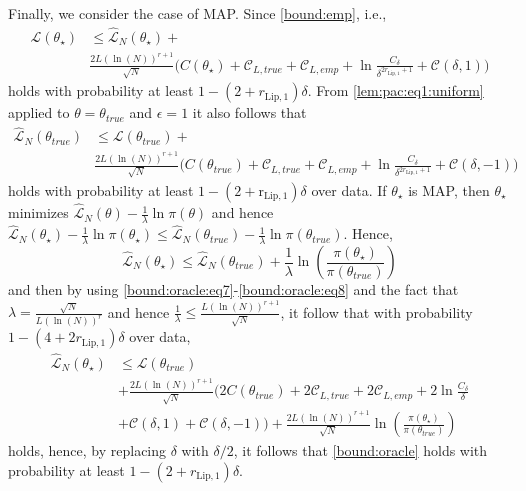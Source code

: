 \documentclass{article}
\begin{document}
Finally, we consider the case of MAP. Since \eqref{bound:emp}, i.e.,
\begin{equation}
    \label{bound:oracle:eq7}
\begin{aligned}
  \mathcal{L}(\theta_{\star}) & \le  \hat{\mathcal{L}}_N(\theta_{\star}) + \\
   & \frac{2L(\ln(N))^{r+1}}{\sqrt{N}} 
  \Big( C(\theta_{\star})+\mathcal{C}_{L,true}+\mathcal{C}_{L,emp}+
     \ln\frac{C_{\delta}}{\delta^{2r_{\text{Lip},1}+1}} + \mathcal{C}(\delta,1) \Big)
\end{aligned}
\end{equation}
holds with probability at least $1-(2+r_{\text{Lip},1})\delta$.
From \eqref{lem:pac:eq1:uniform} applied to $\theta=\theta_{true}$ and $\epsilon=1$ it also follows that 
\begin{equation}
    \label{bound:oracle:eq8}
\begin{aligned}
  \hat{\mathcal{L}}_N(\theta_{true})  &\le \mathcal{L}(\theta_{true}) + \\
    & \frac{2L(\ln(N))^{r+1}}{\sqrt{N}} 
  \Big(
   C(\theta_{true})+ \mathcal{C}_{L,true}+\mathcal{C}_{L,emp}+
     \ln\frac{C_{\delta}}{\delta^{2r_{\text{Lip},1}+1}} + \mathcal{C}(\delta,-1) \Big)
\end{aligned}
\end{equation}
holds with probability at least $1-(2+\mathrm{r_{\text{Lip},1}})\delta$ over data.
If $\theta_{\star}$ is MAP, then $\theta_{\star}$
minimizes $\hat{\mathcal{L}}_N(\theta)-\frac{1}{\lambda} \ln \pi(\theta)$ and hence 
$\hat{\mathcal{L}}_N(\theta_{\star})-\frac{1}{\lambda} \ln \pi(\theta_{\star}) \le 
\hat{\mathcal{L}}_N(\theta_{true})-\frac{1}{\lambda} \ln \pi(\theta_{true})$.
Hence, 
\[
\hat{\mathcal{L}}_N(\theta_{\star}) \le 
\hat{\mathcal{L}}_N(\theta_{true})+\frac{1}{\lambda} \ln \left(\frac{\pi(\theta_{\star})}{\pi(\theta_{true})}\right)
\]
and then by using \eqref{bound:oracle:eq7}-\eqref{bound:oracle:eq8} and the fact that $\lambda=\frac{\sqrt{N}}{L(\ln(N))^r}$ and
hence $\frac{1}{\lambda} \le  \frac{L(\ln(N))^{r+1}}{\sqrt{N}}$,
it follow that with probability $1-(4+2r_{\text{Lip},1})\delta$ over data,
\begin{equation}
\label{pf:col1:eq6}
\begin{split}
 \hat{\mathcal{L}}_N(\theta_{\star})
        & \leq  
        \mathcal{L}(\theta_{true})  \\
        & +\frac{2L(\ln(N))^{r+1}}{\sqrt{N}} 
  \Big(
   2C(\theta_{true})+ 2\mathcal{C}_{L,true}+2\mathcal{C}_{L,emp}+
     2\ln\frac{C_{\delta}}{\delta} \\
     &+ \mathcal{C}(\delta,1)+\mathcal{C}(\delta,-1) \Big) 
        + \frac{2L(\ln(N))^{r+1}}{\sqrt{N}} \ln \left(\frac{\pi(\theta_{\star})}{\pi(\theta_{true})}\right)
\end{split}
\end{equation}
holds, hence, by replacing $\delta$ with $\delta/2$, it follows that  \eqref{bound:oracle} holds with probability
at least $1-(2+r_{\text{Lip},1})\delta$.
\end{document}

